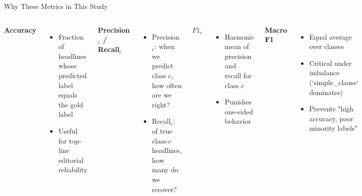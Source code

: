 \documentclass[aspectratio=169, 11pt]{beamer}
\begin{document}
\begin{frame}{Why These Metrics in This Study}
  \begin{columns}
    \textbf{Accuracy}
    \begin{itemize}
      \item Fraction of headlines whose predicted label equals the gold label
      \item Useful for top-line editorial reliability
    \end{itemize}

    \textbf{Precision$_c$ / Recall$_c$}
    \begin{itemize}
      \item Precision$_c$: when we predict class $c$, how often are we right?
      \item Recall$_c$: of true class-$c$ headlines, how many do we recover?
    \end{itemize}

    \textbf{$F1_c$}
    \begin{itemize}
      \item Harmonic mean of precision and recall for class $c$
      \item Punishes one-sided behavior
    \end{itemize}

    \textbf{Macro F1}
    \begin{itemize}
      \item Equal average over classes
      \item Critical under imbalance (`simple\_clause` dominates)
      \item Prevents "high accuracy, poor minority labels"
    \end{itemize}
  \end{columns}
\end{frame}
\end{document}

